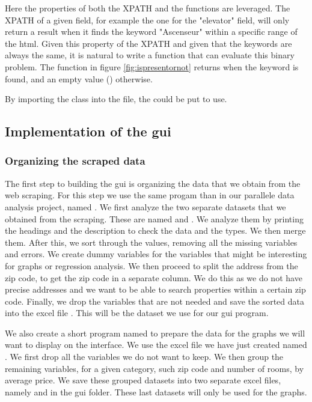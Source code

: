 \documentclass[main]{subfiles}
\begin{document}
Here the properties of both the XPATH and the functions are leveraged.
The XPATH of a given field, for example the one for the "elevator" field, 
will only return a result when it finds the keyword "Ascenseur" within a specific range of the \acs*{html}.
Given this property of the XPATH and given that the keywords are always the same, 
it is natural to write a function that can evaluate this binary problem.
The function in figure \ref{fig:ispresentornot} returns \pkg[True] when the keyword is found,
and an empty value (\pkg[N/A]) otherwise.

By importing the class \pkg[ComparisWebscraperItem] into the  file, the \pkg[ItemLoader] 
could be put to use.

\subsection{Implementation of the \ac{gui}}
\subsubsection{Organizing the scraped data}
The first step to building the \ac{gui} is organizing the data that we obtain from the web scraping.
For this step we use the same progam than in our parallele data analysis project, named .
We first analyze the two separate datasets that we obtained from the scraping. 
These are named  and .
We analyze them by printing the headings and the description to check the data and the types.
We then merge them. After this, we sort through the values, removing all the missing variables and errors. 
We create dummy variables for the variables that might be interesting for graphs or regression analysis.
We then proceed to split the address from the zip code, to get the zip code in a separate column. 
We do this as we do not have precise addresses and we want to be able to search properties within a certain zip code. 
Finally, we drop the variables that are not needed and save the sorted data into the excel file .
This will be the dataset we use for our \ac{gui} program. \par
We also create a short program named  to prepare the data for the graphs 
we will want to display on the interface. We use the excel file we have just created named .
We first drop all the variables we do not want to keep. 
We then group the remaining variables, for a given category, such zip code and number of rooms, by average price.
We save these grouped datasets into two separate excel files, namely  and  in the \ac{gui} folder.
These last datasets will only be used for the graphs.\par
\end{document}
